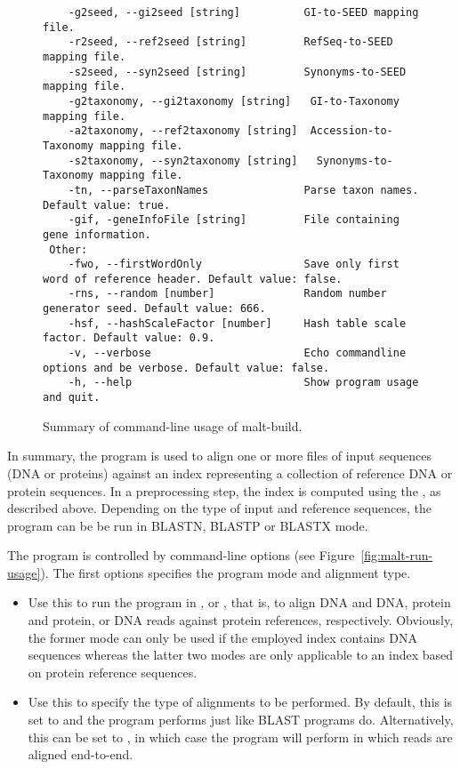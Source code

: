 \documentclass[11pt]{article}
\begin{document}
\begin{figure}[h]
{\begin{verbatim}
	-g2seed, --gi2seed [string]          GI-to-SEED mapping file. 
	-r2seed, --ref2seed [string]         RefSeq-to-SEED mapping file. 
	-s2seed, --syn2seed [string]         Synonyms-to-SEED mapping file. 
	-g2taxonomy, --gi2taxonomy [string]   GI-to-Taxonomy mapping file. 
	-a2taxonomy, --ref2taxonomy [string]  Accession-to-Taxonomy mapping file.
	-s2taxonomy, --syn2taxonomy [string]   Synonyms-to-Taxonomy mapping file. 
	-tn, --parseTaxonNames               Parse taxon names. Default value: true.
	-gif, -geneInfoFile [string]         File containing gene information. 
 Other:
	-fwo, --firstWordOnly                Save only first word of reference header. Default value: false.
	-rns, --random [number]              Random number generator seed. Default value: 666.
	-hsf, --hashScaleFactor [number]     Hash table scale factor. Default value: 0.9.
	-v, --verbose                        Echo commandline options and be verbose. Default value: false.
	-h, --help                           Show program usage and quit.
\end{verbatim}
}
\caption{Summary of command-line usage of malt-build.}\label{fig:malt-build-usage}
\end{figure}

\FloatBarrier


In summary,
the  program  is used to align one or more files of input sequences  (DNA or proteins) against
an index representing a collection of reference  {DNA  or} protein sequences. In a preprocessing step, the index is computed
using the , as described above. Depending on the type of input and reference sequences, 
the program can be be run in {BLASTN,} BLASTP or BLASTX mode.

The  program is controlled by command-line options (see Figure~\ref{fig:malt-run-usage}). 
The first options specifies the program mode and alignment type.
\begin{itemize}
\setlength{\itemindent}{30pt}

\item[\itt{--mode}] Use this to run the program in {,}  or
, that is, to align {DNA and DNA,} protein and protein, or DNA reads against protein references, respectively. Obviously, the former mode can only be used if the employed index contains DNA
sequences whereas the latter two modes are only applicable to an index based on protein reference sequences.
\item[\itt{--alignmentType}]  Use this to specify the type of alignments to be performed.
By default, this is set to  and the program performs  just like BLAST programs do.
Alternatively, this can be set to , in which case the program will perform 
in which reads are aligned end-to-end. 
\end{itemize}
\end{document}
